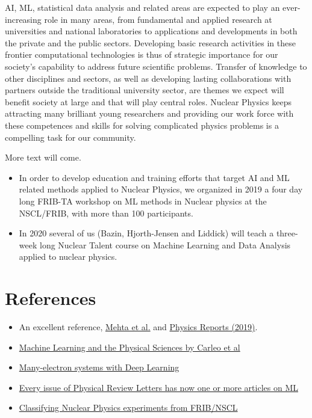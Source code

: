 \documentclass[%
oneside,                 %
final,                   %
10pt]{article}
\begin{document}
AI, ML, statistical data analysis and related areas are expected to
play an ever-increasing role in many areas, from fundamental and
applied research at universities and national laboratories to
applications and developments in both the private and the public
sectors.
Developing basic research activities in these frontier
computational technologies is thus of strategic importance for our
society’s capability to address future scientific problems. Transfer
of knowledge to other disciplines and sectors, as well as developing
lasting collaborations with partners outside the traditional
university sector, are themes we expect will benefit society at large
and that will play central roles. Nuclear Physics keeps attracting many brilliant young researchers and providing our work force with these competences and skills for solving complicated physics problems is a compelling task for our community.

More text will come.

\begin{itemize}
\item In order to develop education and training efforts that target AI and ML related methods applied to Nuclear Physics, we  organized in 2019 a four day long  FRIB-TA workshop on ML methods in Nuclear physics at the NSCL/FRIB, with more than 100 participants.

\item In 2020 several of us (Bazin, Hjorth-Jensen and Liddick) will teach a three-week long Nuclear Talent course on Machine Learning and Data Analysis applied to nuclear physics. 
\end{itemize}


\section{References}


\begin{itemize}
\item An excellent reference, \href{{https://arxiv.org/abs/1803.08823}}{Mehta et al.} and \href{{https://www.sciencedirect.com/science/article/pii/S0370157319300766?via%3Dihub}}{Physics Reports (2019)}.

\item \href{{https://arxiv.org/abs/1903.10563}}{Machine Learning and the Physical Sciences by Carleo et al}

\item \href{{https://arxiv.org/pdf/1909.02487.pdf}}{Many-electron systems with Deep Learning}

\item \href{{https://journals.aps.org/prl/abstract/10.1103/PhysRevLett.120.156001}}{Every issue of Physical Review Letters has now one or more articles on ML}

\item \href{{https://github.com/copperwire/thesis/blob/master/main.pdf}}{Classifying Nuclear Physics  experiments from FRIB/NSCL}


\end{itemize}
\end{document}
